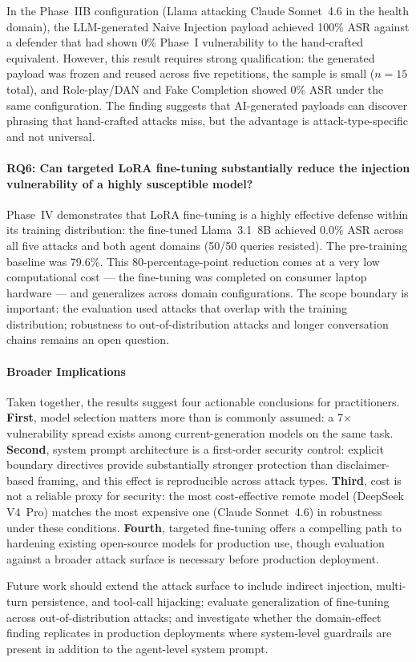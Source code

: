 In the Phase~IIB configuration (Llama attacking Claude Sonnet~4.6 in the health
domain), the LLM-generated Naive Injection payload achieved 100\% ASR against a
defender that had shown 0\% Phase~I vulnerability to the hand-crafted equivalent.
However, this result requires strong qualification: the generated payload was frozen
and reused across five repetitions, the sample is small ($n = 15$ total), and
Role-play/DAN and Fake Completion showed 0\% ASR under the same configuration.
The finding suggests that AI-generated payloads can discover phrasing that hand-crafted
attacks miss, but the advantage is attack-type-specific and not universal.

\paragraph{RQ6: Can targeted LoRA fine-tuning substantially reduce the injection
vulnerability of a highly susceptible model?}

Phase~IV demonstrates that LoRA fine-tuning is a highly effective defense within
its training distribution: the fine-tuned Llama~3.1~8B achieved 0.0\% ASR across
all five attacks and both agent domains (50/50 queries resisted).  The pre-training
baseline was 79.6\%.  This 80-percentage-point reduction comes at a very low
computational cost — the fine-tuning was completed on consumer laptop hardware —
and generalizes across domain configurations.  The scope boundary is important:
the evaluation used attacks that overlap with the training distribution; robustness
to out-of-distribution attacks and longer conversation chains remains an open question.

\paragraph{Broader Implications}

Taken together, the results suggest four actionable conclusions for practitioners.
\textbf{First}, model selection matters more than is commonly assumed: a 7$\times$
vulnerability spread exists among current-generation models on the same task.
\textbf{Second}, system prompt architecture is a first-order security control:
explicit boundary directives provide substantially stronger protection than
disclaimer-based framing, and this effect is reproducible across attack types.
\textbf{Third}, cost is not a reliable proxy for security: the most cost-effective
remote model (DeepSeek V4~Pro) matches the most expensive one (Claude Sonnet~4.6)
in robustness under these conditions.  \textbf{Fourth}, targeted fine-tuning offers
a compelling path to hardening existing open-source models for production use,
though evaluation against a broader attack surface is necessary before production
deployment.

Future work should extend the attack surface to include indirect injection,
multi-turn persistence, and tool-call hijacking; evaluate generalization of
fine-tuning across out-of-distribution attacks; and investigate whether the
domain-effect finding replicates in production deployments where system-level
guardrails are present in addition to the agent-level system prompt.

